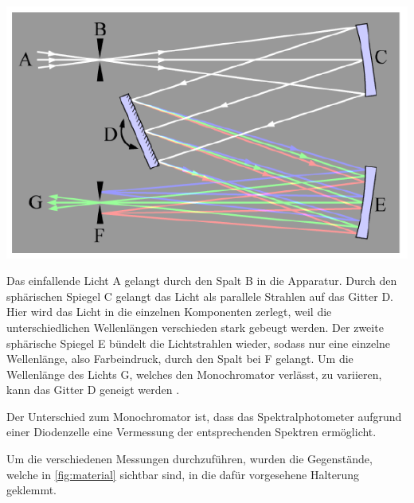 \documentclass[11pt,ngerman]{scrartcl}
\begin{document}
\begin{center}
	\begin{minipage}{0.5\textwidth}
		\includegraphics[width=\textwidth]{monoc}
		\label{fig:monoc}
	\end{minipage}
\end{center}

\noindent Das einfallende Licht A gelangt durch den Spalt B in die Apparatur.
Durch den sphärischen Spiegel C gelangt das Licht als parallele Strahlen auf
das Gitter D. Hier wird das Licht in die einzelnen Komponenten zerlegt, weil
die unterschiedlichen Wellenlängen verschieden stark gebeugt werden. Der zweite
sphärische Spiegel E bündelt die Lichtstrahlen wieder, sodass nur eine einzelne
Wellenlänge, also Farbeindruck, durch den Spalt bei F gelangt. Um die
Wellenlänge des Lichts G, welches den Monochromator verlässt, zu variieren,
kann das Gitter D geneigt werden \cite{demtroder2018ex2}.

\vspace{2mm}

\noindent Der Unterschied zum Monochromator ist, dass das Spektralphotometer
aufgrund einer Diodenzelle eine Vermessung der entsprechenden Spektren
ermöglicht.

\vspace{2mm}

\noindent Um die verschiedenen Messungen durchzuführen, wurden die Gegenstände,
welche in \autoref{fig:material} sichtbar sind, in die dafür vorgesehene
Halterung geklemmt.
\end{document}
